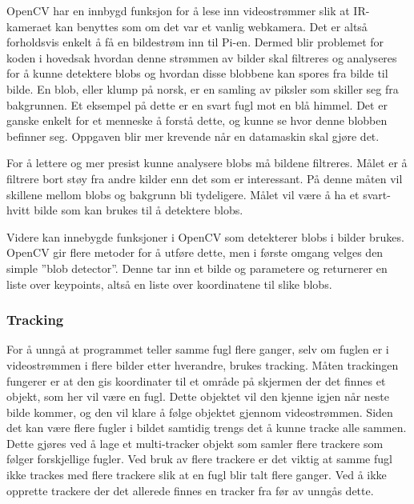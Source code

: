 OpenCV  har en innbygd funksjon for å lese inn videostrømmer slik at IR-kameraet kan benyttes  som om det var et vanlig webkamera. Det er altså forholdsvis enkelt å få en bildestrøm inn til Pi-en. Dermed blir problemet for koden i hovedsak hvordan denne strømmen av bilder skal filtreres og analyseres for å kunne detektere blobs og hvordan disse blobbene kan spores fra bilde til bilde. En blob, eller klump på norsk, er en samling av piksler som skiller seg fra bakgrunnen. Et eksempel på dette er en svart fugl mot en blå himmel. Det er ganske enkelt for et menneske å forstå dette, og kunne se hvor denne blobben befinner seg. Oppgaven blir mer krevende når en datamaskin skal gjøre det. 

For å lettere og mer presist kunne analysere blobs må bildene filtreres. Målet er å filtrere bort støy fra andre kilder enn det som er interessant. På denne måten vil skillene mellom blobs og bakgrunn bli tydeligere. Målet vil være å ha et svart-hvitt bilde som kan brukes til å detektere blobs. 

Videre kan innebygde funksjoner i OpenCV som  detekterer blobs i bilder brukes. OpenCV gir flere metoder for å utføre dette, men i første omgang velges den simple ''blob detector''. Denne tar inn et bilde og parametere  og returnerer en liste over keypoints, altså en liste over koordinatene til slike blobs.

\subsubsection{Tracking}
\label{subsubsec:tracking}
For å unngå at programmet teller samme fugl flere ganger, selv om fuglen er i videostrømmen i flere bilder etter hverandre, brukes tracking. Måten trackingen fungerer er at den gis koordinater til et område på skjermen der det finnes et objekt, som her vil være en fugl. Dette objektet vil den kjenne igjen når neste bilde kommer, og den vil klare å følge objektet gjennom videostrømmen.
Siden det kan være flere fugler i bildet samtidig trengs det å kunne tracke alle sammen. Dette gjøres ved å lage et multi-tracker objekt som samler flere trackere som følger forskjellige fugler. Ved bruk av flere trackere er det viktig at samme fugl ikke trackes med flere trackere slik at en fugl blir talt flere ganger. Ved å ikke opprette trackere der det allerede finnes en tracker fra før av unngås dette. 

